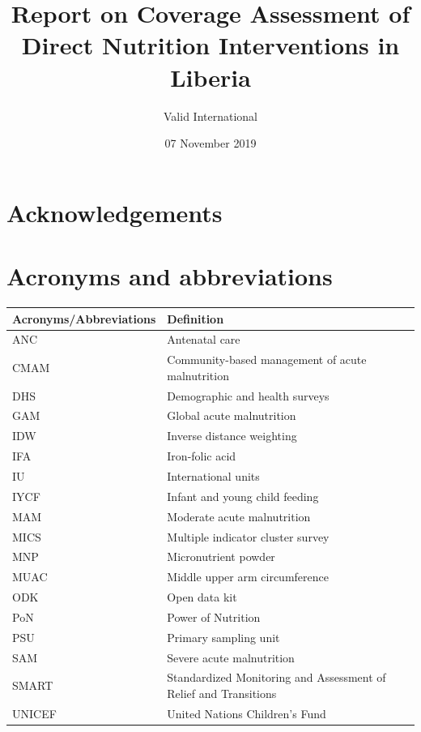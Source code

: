\documentclass[12pt,a4paper]{article}
\title{\vspace{3.5in}Report on Coverage Assessment of Direct Nutrition Interventions in Liberia}
\author{Valid International}
\date{07 November 2019}
\begin{document}
\maketitle

\newpage

{
\hypersetup{linkcolor=black}
\setcounter{tocdepth}{3}
\tableofcontents
}
\listoftables
\listoffigures
\newpage

\hypertarget{acknowledgements}{%
\section*{Acknowledgements}\label{acknowledgements}}

\newpage

\hypertarget{acronyms-and-abbreviations}{%
\section*{Acronyms and abbreviations}\label{acronyms-and-abbreviations}}

\begin{longtable}{ll}
\toprule
\textbf{Acronyms/Abbreviations} & \textbf{Definition}\\
\midrule
ANC & Antenatal care\\
CMAM & Community-based management of acute malnutrition\\
DHS & Demographic and health surveys\\
GAM & Global acute malnutrition\\
IDW & Inverse distance weighting\\
\addlinespace
IFA & Iron-folic acid\\
IU & International units\\
IYCF & Infant and young child feeding\\
MAM & Moderate acute malnutrition\\
MICS & Multiple indicator cluster survey\\
\addlinespace
MNP & Micronutrient powder\\
MUAC & Middle upper arm circumference\\
ODK & Open data kit\\
PoN & Power of Nutrition\\
PSU & Primary sampling unit\\
\addlinespace
SAM & Severe acute malnutrition\\
SMART & Standardized Monitoring and Assessment of Relief and Transitions\\
UNICEF & United Nations Children's Fund\\
\bottomrule
\end{longtable}
\end{document}
